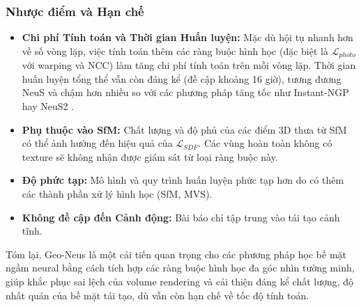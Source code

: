 \subsubsection{Nhược điểm và Hạn chế}
\begin{itemize}
    \item \textbf{Chi phí Tính toán và Thời gian Huấn luyện:} Mặc dù hội tụ nhanh hơn về số vòng lặp, việc tính toán thêm các ràng buộc hình học (đặc biệt là $\mathcal{L}_{photo}$ với warping và NCC) làm tăng chi phí tính toán trên mỗi vòng lặp. Thời gian huấn luyện tổng thể vẫn còn đáng kể (đề cập khoảng 16 giờ), tương đương NeuS và chậm hơn nhiều so với các phương pháp tăng tốc như Instant-NGP hay NeuS2 \cite{Fu2022GeoNeus_source_149, Fu2022GeoNeus_source_188}.
    \item \textbf{Phụ thuộc vào SfM:} Chất lượng và độ phủ của các điểm 3D thưa từ SfM có thể ảnh hưởng đến hiệu quả của $\mathcal{L}_{SDF}$. Các vùng hoàn toàn không có texture sẽ không nhận được giám sát từ loại ràng buộc này.
    \item \textbf{Độ phức tạp:} Mô hình và quy trình huấn luyện phức tạp hơn do có thêm các thành phần xử lý hình học (SfM, MVS).
    \item \textbf{Không đề cập đến Cảnh động:} Bài báo chỉ tập trung vào tái tạo cảnh tĩnh.
\end{itemize}

Tóm lại, Geo-Neus là một cải tiến quan trọng cho các phương pháp học bề mặt ngầm neural bằng cách tích hợp các ràng buộc hình học đa góc nhìn tường minh, giúp khắc phục sai lệch của volume rendering và cải thiện đáng kể chất lượng, độ nhất quán của bề mặt tái tạo, dù vẫn còn hạn chế về tốc độ tính toán.
